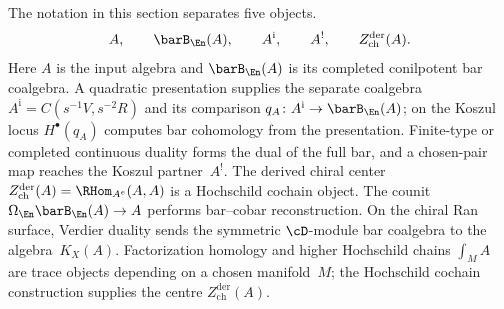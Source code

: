 \begin{convention}
\label{conv:en-five-object-firewall}
The notation in this section separates five objects.
\[
A,\qquad
\barB_{\En}(A),\qquad
A^{\mathrm{i}},\qquad
A^!,\qquad
Z^{\mathrm{der}}_{\mathrm{ch}}(A).
\]
Here $A$ is the input algebra and $\barB_{\En}(A)$ is its completed
conilpotent bar coalgebra.  A quadratic presentation supplies the
separate coalgebra
$A^{\mathrm i}=C(s^{-1}V,s^{-2}R)$ and its comparison
$q_A\colon A^{\mathrm i}\to\barB_{\En}(A)$; on the Koszul locus
$H^\bullet(q_A)$ computes bar cohomology from the presentation.
Finite-type or completed continuous duality forms the dual of the
full bar, and a chosen-pair map reaches the Koszul partner~$A^!$.
The derived chiral center
$Z^{\mathrm{der}}_{\mathrm{ch}}(A)=\RHom_{A^e}(A,A)$ is a Hochschild
cochain object. The counit
$\Omega_{\En}\barB_{\En}(A)\to A$ performs bar--cobar
reconstruction. On the chiral Ran surface, Verdier duality sends the
symmetric $\cD$-module bar coalgebra to the algebra~$K_X(A)$.
Factorization homology and higher Hochschild chains
$\int_M A$ are trace objects depending on a chosen manifold~$M$;
the Hochschild cochain construction supplies the centre
$Z^{\mathrm{der}}_{\mathrm{ch}}(A)$.
\end{convention}

